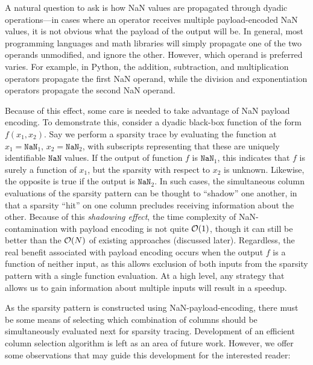 A natural question to ask is how NaN values are propagated through dyadic operations—in cases where an operator receives multiple payload-encoded NaN values, it is not obvious what the payload of the output will be. In general, most programming languages and math libraries will simply propagate one of the two operands unmodified, and ignore the other. However, which operand is preferred varies. For example, in Python, the addition, subtraction, and multiplication operators propagate the first NaN operand, while the division and exponentiation operators propagate the second NaN operand.

Because of this effect, some care is needed to take advantage of NaN payload encoding. To demonstrate this, consider a dyadic black-box function of the form $f(x_1, x_2)$. Say we perform a sparsity trace by evaluating the function at $x_1=\texttt{NaN}_1$, $x_2=\texttt{NaN}_2$, with subscripts representing that these are uniquely identifiable $\texttt{NaN}$ values. If the output of function $f$ is $\texttt{NaN}_1$, this indicates that $f$ is surely a function of $x_1$, but the sparsity with respect to $x_2$ is unknown. Likewise, the opposite is true if the output is $\texttt{NaN}_2$. In such cases, the simultaneous column evaluations of the sparsity pattern can be thought to ``shadow'' one another, in that a sparsity ``hit'' on one column precludes receiving information about the other. Because of this \emph{shadowing effect}, the time complexity of NaN-contamination with payload encoding is not quite $\mathcal{O}(1)$, though it can still be better than the $\mathcal{O}(N)$ of existing approaches (discussed later). Regardless, the real benefit associated with payload encoding occurs when the output $f$ is a function of neither input, as this allows exclusion of both inputs from the sparsity pattern with a single function evaluation. At a high level, any strategy that allows us to gain information about multiple inputs will result in a speedup.

As the sparsity pattern is constructed using NaN-payload-encoding, there must be some means of selecting which combination of columns should be simultaneously evaluated next for sparsity tracing. Development of an efficient column selection algorithm is left as an area of future work. However, we offer some observations that may guide this development for the interested reader:

